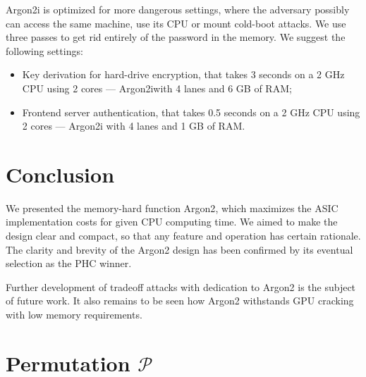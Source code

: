 \documentclass[a4paper]{article}
\begin{document}
\textsf{Argon2i} is optimized for more dangerous settings, where the adversary possibly can access the same machine, use its CPU or mount cold-boot attacks. We use three passes to get rid entirely of the password in the memory. We suggest the following settings:
\begin{itemize}
  \item Key derivation for hard-drive encryption, that takes 3 seconds on a 2 GHz CPU using 2 cores --- \textsf{Argon2i}with 4 lanes and 6 GB of RAM;
  \item Frontend server authentication, that takes 0.5 seconds on a 2 GHz CPU using 2 cores --- \textsf{Argon2i} with 4 lanes and 1 GB of RAM.
\end{itemize}




\section{Conclusion}

We presented  the memory-hard function \textsf{Argon2}, which maximizes the ASIC implementation costs for given CPU computing time. We aimed to make the design clear and compact, so that any feature and operation has certain rationale. The clarity and brevity of the Argon2 design has been confirmed by its eventual selection as the PHC winner.

Further development of tradeoff attacks with dedication to \textsf{Argon2} is the subject of future work. It also remains to be seen how \textsf{Argon2} withstands GPU cracking with low memory requirements.






\appendix 



\section{Permutation $\mathcal{P}$}\label{sec:blakeround}
\end{document}
